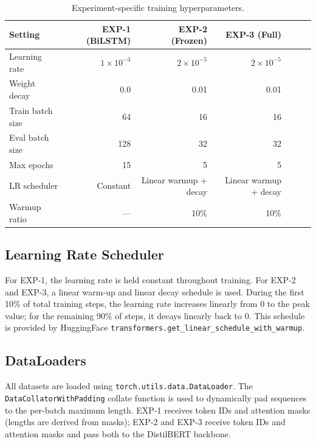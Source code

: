 \begin{table}[H]
    \centering
    \caption{Experiment-specific training hyperparameters.}
    \label{tab:training_hparams}
    \begin{tabularx}{\textwidth}{l r r r r r r}
        \toprule
        \textbf{Setting} & \textbf{EXP-1 (BiLSTM)} & \textbf{EXP-2 (Frozen)} & \textbf{EXP-3 (Full)} \\
        \midrule
        Learning rate         & $1\times10^{-3}$ & $2\times10^{-5}$ & $2\times10^{-5}$ \\
        Weight decay          & 0.0              & 0.01             & 0.01             \\
        Train batch size      & 64               & 16               & 16               \\
        Eval batch size       & 128              & 32               & 32               \\
        Max epochs            & 15               & 5                & 5                \\
        LR scheduler          & Constant         & Linear warmup + decay & Linear warmup + decay \\
        Warmup ratio          & ---              & 10\%             & 10\%             \\
        \bottomrule
    \end{tabularx}
\end{table}

\subsection{Learning Rate Scheduler}

For EXP-1, the learning rate is held constant throughout training. For EXP-2 and EXP-3, a linear warm-up and linear decay schedule is used. During the first 10\% of total training steps, the learning rate increases linearly from 0 to the peak value; for the remaining 90\% of steps, it decays linearly back to 0. This schedule is provided by HuggingFace \texttt{transformers.get\_linear\_schedule\_with\_warmup}.

\subsection{DataLoaders}

All datasets are loaded using \texttt{torch.utils.data.DataLoader}. The \texttt{DataCollatorWithPadding} collate function is used to dynamically pad sequences to the per-batch maximum length. EXP-1 receives token IDs and attention masks (lengths are derived from masks); EXP-2 and EXP-3 receive token IDs and attention masks and pass both to the DistilBERT backbone.

